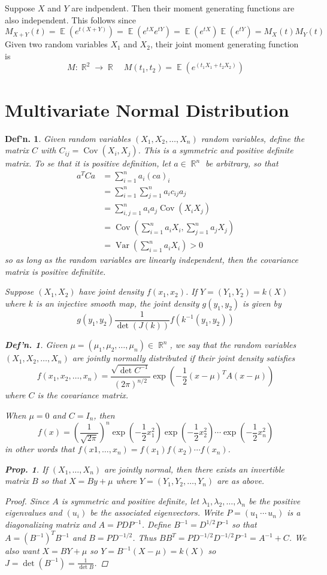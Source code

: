 \documentclass[12pt, a4paper]{book}
\DeclareMathOperator{\R}{\mathbb{R}}
\DeclareMathOperator{\E}{\mathbb{E}}
\DeclareMathOperator{\Var}{Var}
\DeclareMathOperator{\Cov}{Cov}
\newtheorem{definition}[theorem]{Def'n.}
\newtheorem{proposition}[theorem]{Prop.}
\theoremstyle{nonumberplain}
\newtheorem{proof}{Proof}
\begin{document}
Suppose $X$ and $Y$ are indpendent.
Then their moment generating functions are also independent.
This follows since
\[M_{X+Y}(t)=\E(e^{t(X+Y)})=\E(e^{tX}e^{tY})=\E(e^{tX})\E(e^{tY})=M_X(t)M_Y(t)\]
Given two random variables $X_1$ and $X_2$, their joint moment generating function is
\[M:\R^2\to\R\quad M(t_1,t_2)=\E(e^{(t_1X_1+t_2X_2)})\]
\section{Multivariate Normal Distribution}
\begin{definition}
    Given random variables $(X_1,X_2,\ldots,X_n)$ random variables, define the matrix $C$ with $C_{ij}=\Cov(X_i,X_j)$.
    This is a symmetric and positive definite matrix.
To se that it is positive definition, let $a\in\R^n$ be arbitrary, so that
\begin{align*}
    a^TCa &= \sum\limits_{i=1}^n a_i(ca)_i\\
          &= \sum\limits_{i=1}^n\sum\limits_{j=1}^n a_i c_{ij}a_j\\
          &= \sum\limits_{i,j=1}^n a_i a_j\Cov(X_iX_j)\\
          &= \Cov\left(\sum\limits_{i=1}^n a_iX_i,\sum\limits_{j=1}^n a_jX_j\right)\\
          &= \Var\left(\sum\limits_{i=1}^n a_iX_i\right)>0
\end{align*}
so as long as the random variables are linearly independent, then the covariance matrix is positive definitite.

Suppose $(X_1,X_2)$ have joint density $f(x_1,x_2)$.
If $Y=(Y_1,Y_2)=k(X)$ where $k$ is an injective smooth map, the joint density $g(y_1,y_2)$ is given by
\[g(y_1,y_2)\frac{1}{\det(J(k))}f(k^{-1}(y_1,y_2))\]
\begin{definition}
    Given $\mu=(\mu_1,\mu_2,\ldots,\mu_n)\in\R^n$, we say that the random variables $(X_1,X_2,\ldots,X_n)$ are jointly normally distributed if their joint density satisfies
    \[f(x_1,x_2,\ldots,x_n) = \frac{\sqrt{\det C^{-1}}}{(2\pi)^{n/2}}\exp\left(-\frac{1}{2}(x-\mu)^TA(x-\mu)\right)\]
    where $C$ is the covariance matrix.
\end{definition}
When $\mu=0$ and $C=I_n$, then
\[f(x)=\left(\frac{1}{\sqrt{2\pi}}\right)^n\exp\left(-\frac{1}{2}x_1^2\right)\exp\left(-\frac{1}{2}x_2^2\right)\cdots\exp\left(-\frac{1}{2}x_n^2\right)\]
in other words that $f(x1,\ldots,x_n)=f(x_1)f(x_2)\cdots f(x_n)$.
\begin{proposition}
    If $(X_1,\ldots,X_n)$ are jointly normal, then there exists an invertible matrix $B$ so that $X=By+\mu$ where $Y=(Y_1,Y_2,\ldots,Y_n)$ are as above.
\end{proposition}
\begin{proof}
    Since $A$ is symmetric and positive definite, let $\lambda_1,\lambda_2,\ldots,\lambda_n$ be the positive eigenvalues and $(u_i)$ be the associated eigenvectors.
    Write $P=(u_1\,\cdots\, u_n)$ is a diagonalizing matrix and $A=PDP^{-1}$.
    Define $B^{-1}=D^{1/2}P^{-1}$ so that $A=(B^{-1})^TB^{-1}$ and $B=PD^{-1/2}$.
    Thus $BB^{T}=PD^{-1/2}D^{-1/2}P^{-1}=A^{-1}+C$.
    We also want $X=BY+\mu$ so $Y=B^{-1}(X-\mu)=k(X)$ so $J=\det(B^{-1})=\frac{1}{\det B}$.


\end{proof}
\end{definition}
\end{document}
